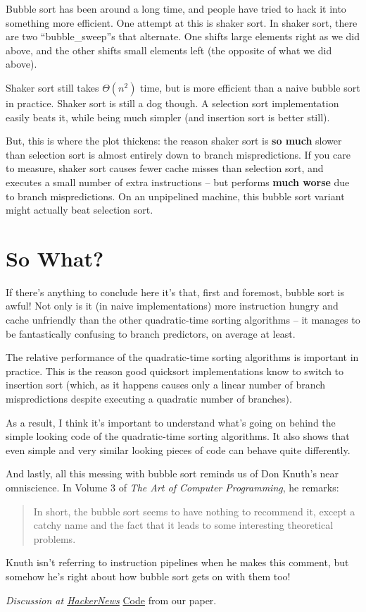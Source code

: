 \documentclass[11pt]{article}
\begin{document}
Bubble sort has been around a long time, and people have tried to hack it into something more efficient. One attempt at this is shaker sort. In shaker sort, there are two ``bubble\_sweep''s that alternate. One shifts large elements right as we did above, and the other shifts small elements left (the opposite of what we did above).

Shaker sort still takes $\Theta(n^2)$ time, but is more efficient than a naive bubble sort in practice. Shaker sort is still a dog though. A selection sort implementation easily beats it, while being much simpler (and insertion sort is better still).

But, this is where the plot thickens: the reason shaker sort is \textbf{so much} slower than selection sort is almost entirely down to branch mispredictions. If you care to measure, shaker sort causes fewer cache misses than selection sort, and executes a small number of extra instructions -- but performs \textbf{much worse} due to branch mispredictions. On an unpipelined machine, this bubble sort variant might actually beat selection sort.

\section{So What?}

If there's anything to conclude here it's that, first and foremost, bubble sort is awful! Not only is it (in naive implementations) more instruction hungry and cache unfriendly than the other quadratic-time sorting algorithms -- it manages to be fantastically confusing to branch predictors, on average at least.

The relative performance of the quadratic-time sorting algorithms is important in practice. This is the reason good quicksort implementations know to switch to insertion sort (which, as it happens causes only a linear number of branch mispredictions despite executing a quadratic number of branches).

As a result, I think it's important to understand what's going on behind the simple looking code of the quadratic-time sorting algorithms. It also shows that even simple and very similar looking pieces of code can behave quite differently.

And lastly, all this messing with bubble sort reminds us of Don Knuth's near omniscience. In Volume 3 of \emph{The Art of Computer Programming}, he remarks:

\begin{quote}
In short, the bubble sort seems to have nothing to recommend it, except
a catchy name and the fact that it leads to some interesting theoretical
problems.
\end{quote}

Knuth isn't referring to instruction pipelines when he makes this comment, but somehow he's right about how bubble sort gets on with them too!

\emph{Discussion at \href{http://news.ycombinator.com/item?id=4646509}{HackerNews}}
\href{https://github.com/pbiggar/sorting-branches-caching}{Code} from our paper.
\end{document}
